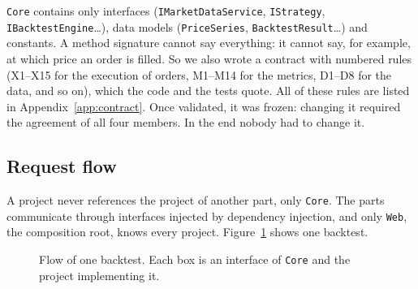 \documentclass[11pt,a4paper]{article}
\newcommand{\code}[1]{\texttt{\small #1}}
\begin{document}
\code{Core} contains only interfaces (\code{IMarketDataService}, \code{IStrategy}, \code{IBacktestEngine}\dots), data models (\code{PriceSeries}, \code{BacktestResult}\dots) and constants. A method signature cannot say everything: it cannot say, for example, at which price an order is filled. So we also wrote a contract with numbered rules (X1--X15 for the execution of orders, M1--M14 for the metrics, D1--D8 for the data, and so on), which the code and the tests quote. All of these rules are listed in Appendix~\ref{app:contract}. Once validated, it was frozen: changing it required the agreement of all four members. In the end nobody had to change it.

\subsection{Request flow}

A project never references the project of another part, only \code{Core}. The parts communicate through interfaces injected by dependency injection, and only \code{Web}, the composition root, knows every project. Figure~\ref{fig:flow} shows one backtest.

\begin{figure}[H]
\centering
{}
\caption{Flow of one backtest. Each box is an interface of \code{Core} and the project implementing it.}
\label{fig:flow}
\end{figure}
\end{document}
